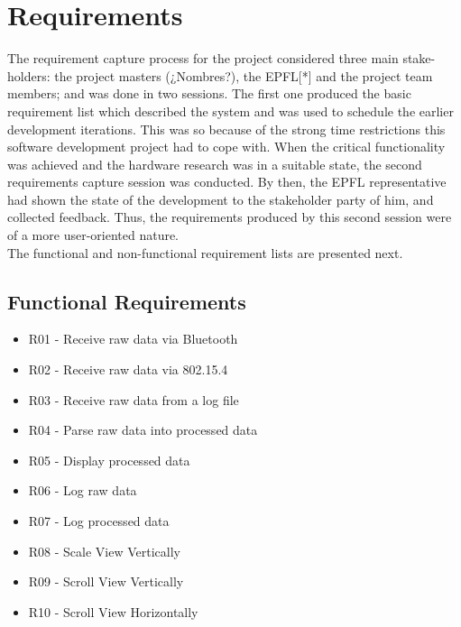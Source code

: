 	\section{Requirements}
	\label{sec:sw-reqs}
		The requirement capture process for the project considered three main stake-holders: the project masters (¿Nombres?), the EPFL[*] and the project team members; and was done in two sessions. The first one produced the basic requirement list which described the system and was used to schedule the earlier development iterations. This was so because of the strong time restrictions this software development project had to cope with. 
		When the critical functionality was achieved and the hardware research was in a suitable state, the second requirements capture session was conducted. By then, the EPFL representative  had shown the state of the development to the stakeholder party of him, and collected feedback. Thus, the requirements produced by this second session were of a more user-oriented nature.\\

		
		The functional and non-functional requirement lists are presented next.

		\subsection{Functional Requirements}
		\begin{itemize}
		\item R01 - Receive raw data via Bluetooth
		\item R02 - Receive raw data via 802.15.4
		\item R03 - Receive raw data from a log file
		\item R04 - Parse raw data into processed data
		\item R05 - Display processed data
		\item R06 - Log raw data
		\item R07 - Log processed data	%
		\item R08 - Scale View Vertically
		\item R09 - Scroll View Vertically
		\item R10 - Scroll View Horizontally
		\end{itemize}

